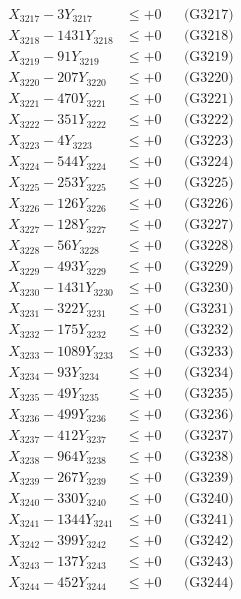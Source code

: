 \documentclass[a4paper,10pt]{article}
\begin{document}
{\begin{align}
X_{3217} - 3Y_{3217} &\leq +0 && \text{(G3217)} \\
X_{3218} - 1431Y_{3218} &\leq +0 && \text{(G3218)} \\
X_{3219} - 91Y_{3219} &\leq +0 && \text{(G3219)} \\
X_{3220} - 207Y_{3220} &\leq +0 && \text{(G3220)} \\
\allowbreak
X_{3221} - 470Y_{3221} &\leq +0 && \text{(G3221)} \\
X_{3222} - 351Y_{3222} &\leq +0 && \text{(G3222)} \\
X_{3223} - 4Y_{3223} &\leq +0 && \text{(G3223)} \\
X_{3224} - 544Y_{3224} &\leq +0 && \text{(G3224)} \\
X_{3225} - 253Y_{3225} &\leq +0 && \text{(G3225)} \\
X_{3226} - 126Y_{3226} &\leq +0 && \text{(G3226)} \\
X_{3227} - 128Y_{3227} &\leq +0 && \text{(G3227)} \\
X_{3228} - 56Y_{3228} &\leq +0 && \text{(G3228)} \\
X_{3229} - 493Y_{3229} &\leq +0 && \text{(G3229)} \\
X_{3230} - 1431Y_{3230} &\leq +0 && \text{(G3230)} \\
\allowbreak
X_{3231} - 322Y_{3231} &\leq +0 && \text{(G3231)} \\
X_{3232} - 175Y_{3232} &\leq +0 && \text{(G3232)} \\
X_{3233} - 1089Y_{3233} &\leq +0 && \text{(G3233)} \\
X_{3234} - 93Y_{3234} &\leq +0 && \text{(G3234)} \\
X_{3235} - 49Y_{3235} &\leq +0 && \text{(G3235)} \\
X_{3236} - 499Y_{3236} &\leq +0 && \text{(G3236)} \\
X_{3237} - 412Y_{3237} &\leq +0 && \text{(G3237)} \\
X_{3238} - 964Y_{3238} &\leq +0 && \text{(G3238)} \\
X_{3239} - 267Y_{3239} &\leq +0 && \text{(G3239)} \\
X_{3240} - 330Y_{3240} &\leq +0 && \text{(G3240)} \\
\allowbreak
X_{3241} - 1344Y_{3241} &\leq +0 && \text{(G3241)} \\
X_{3242} - 399Y_{3242} &\leq +0 && \text{(G3242)} \\
X_{3243} - 137Y_{3243} &\leq +0 && \text{(G3243)} \\
X_{3244} - 452Y_{3244} &\leq +0 && \text{(G3244)} \\

\end{align}}
\end{document}
